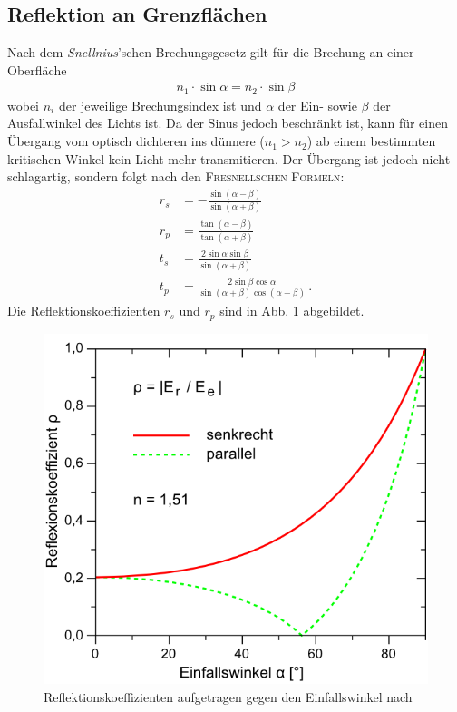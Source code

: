 \documentclass[12pt,a4paper,titlepage,headinclude,bibtotoc]{scrartcl}
\begin{document}
\subsection{Reflektion an Grenzflächen}
Nach dem \textit{Snellnius}'schen Brechungsgesetz gilt für die Brechung an einer Oberfläche
\begin{align}
	n_1\cdot\sin\alpha=n_2\cdot\sin\beta
\end{align}
wobei $n_i$ der jeweilige Brechungsindex ist und $\alpha$ der Ein- sowie $\beta$ der Ausfallwinkel des Lichts ist.
Da der Sinus jedoch beschränkt ist, kann für einen Übergang vom optisch dichteren ins dünnere ($n_1 > n_2$) ab einem bestimmten kritischen Winkel kein Licht mehr transmitieren.
Der Übergang ist jedoch nicht schlagartig, sondern folgt nach \cite[S. 238]{demtroeder2} den \textsc{Fresnellschen Formeln}:
\begin{align}
	r_s &= -\frac{\sin (\alpha -\beta )}{\sin ( \alpha + \beta )}\\
	r_p &= \frac{\tan (\alpha - \beta )}{\tan ( \alpha + \beta )}\\
	t_s &= \frac{2\sin\alpha\sin\beta}{\sin (\alpha +\beta )}\\
	t_p &= \frac{2\sin\beta\cos\alpha}{\sin ( \alpha + \beta )\cos(\alpha - \beta)}\, .
\end{align}
Die Reflektionskoeffizienten $r_s$ und $r_p$ sind in Abb. \ref{fig:reflektion} abgebildet.


\begin{figure}[h]
	\centering
	\includegraphics{fresnelkoeff_lp}
	\caption{Reflektionskoeffizienten aufgetragen gegen den Einfallswinkel nach \cite[28.3.2015, 15 Uhr]{lp20}}
	\label{fig:reflektion}
\end{figure}
\end{document}
